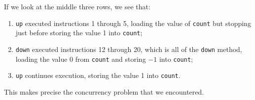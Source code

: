 \documentclass{book}
\begin{document}
If we look at the middle three rows, we see that:
\begin{enumerate}
\item \texttt{up} executed instructions 1 through 5, loading the value of
\texttt{count} but stopping just before storing the value 1 into \texttt{count};
\item \texttt{down} executed instructions 12 through 20, which is all of the
\texttt{down} method, loading the value 0 from \texttt{count} and storing $-1$
into \texttt{count};
\item \texttt{up} continues execution, storing the value 1 into \texttt{count}.
\end{enumerate}

This makes precise the concurrency problem that we encountered.
\end{document}
